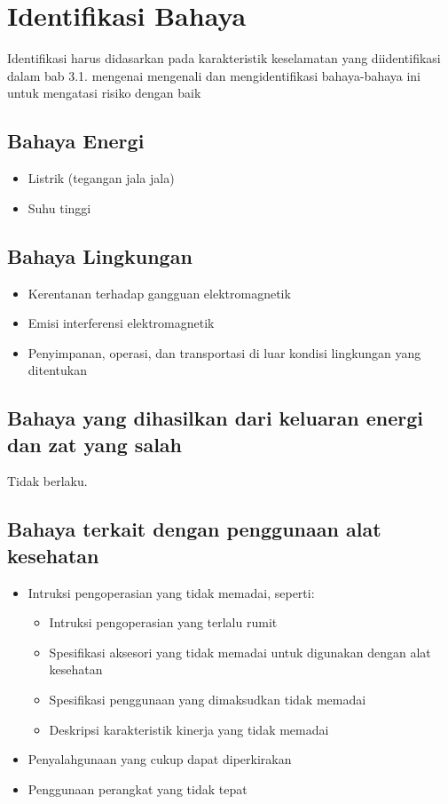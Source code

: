 \documentclass[11pt,a4paper,twoside,onecolumn]{book}
\begin{document}
		\section{Identifikasi Bahaya}
		Identifikasi harus didasarkan pada karakteristik keselamatan yang diidentifikasi dalam bab 3.1. mengenai mengenali dan mengidentifikasi bahaya-bahaya ini untuk mengatasi risiko dengan baik 
		
			\subsection{Bahaya Energi}
			\begin{itemize}
				\item Listrik (tegangan jala jala)
				\item Suhu tinggi
			\end{itemize}
			
			\subsection{Bahaya Lingkungan}
			\begin{itemize}
				\item Kerentanan terhadap gangguan elektromagnetik
				\item Emisi interferensi elektromagnetik
				\item Penyimpanan, operasi, dan transportasi di luar kondisi lingkungan yang ditentukan
			\end{itemize}
			
			\subsection{Bahaya yang dihasilkan dari keluaran energi dan zat yang salah}
			Tidak berlaku.
			
			\subsection{Bahaya terkait dengan penggunaan alat kesehatan}
			\begin{itemize}
				\item Intruksi pengoperasian yang tidak memadai, seperti:
				\begin{itemize}
					\item Intruksi pengoperasian yang terlalu rumit
					\item Spesifikasi aksesori yang tidak memadai untuk digunakan dengan alat kesehatan 
					\item Spesifikasi penggunaan yang dimaksudkan tidak memadai
					\item Deskripsi karakteristik kinerja yang tidak memadai
				\end{itemize}
				\item Penyalahgunaan yang cukup dapat diperkirakan
				\item Penggunaan perangkat yang tidak tepat
			\end{itemize}
			
\end{document}
